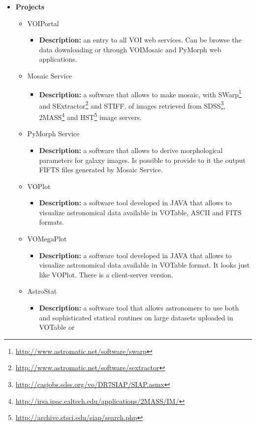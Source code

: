 \begin{itemize}
\item \textbf{Projects}
\begin{itemize}
\item VOIPortal
\begin{itemize}
\item \textbf{Description:} an entry to all VOI web services. Can be browse the
data downloading or through VOIMosaic and PyMorph web applications.
\end{itemize}
\item Mosaic Service
\begin{itemize}
\item \textbf{Description:} a software that allows to make mosaic, with
SWarp\footnote{\url{http://www.astromatic.net/software/swarp}} and
SExtractor\footnote{\url{http://www.astromatic.net/software/sextractor}} and
STIFF, of images retrieved from
SDSS\footnote{\url{http://casjobs.sdss.org/vo/DR7SIAP/SIAP.asmx}},
2MASS\footnote{\url{http://irsa.ipac.caltech.edu/applications/2MASS/IM/}} and
HST\footnote{\url{http://archive.stsci.edu/siap/search.php}} image servers.
\end{itemize}
\item PyMorph Service
\begin{itemize}
\item \textbf{Description:} a software that allows to derive morphological
parameters for galaxy images. Is possible to provide to it the output FIFTS
files generated by Mosaic Service.
\end{itemize}
\item VOPlot
\begin{itemize}
\item \textbf{Description:} a software tool developed in JAVA that allows to
visualize astronomical data available in VOTable, ASCII and FITS formats.
\end{itemize}
\item VOMegaPlot
\begin{itemize}
\item \textbf{Description:} a software tool developed in JAVA that allows to
visualize astronomical data available in VOTable format. It looks just like
VOPlot. There is a client-server version.
\end{itemize}
\item AstroStat
\begin{itemize}
\item \textbf{Description:} a software tool that allows astronomers to use both
and sophisticated statical routines on large datasets uploaded in VOTable or

\end{itemize}
\end{itemize}
\end{itemize}
